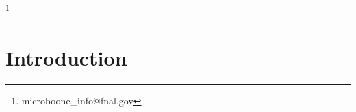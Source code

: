 \documentclass[amsmath,amssymb,aps,prd,showpacs,twocolumn,superscriptaddress,letterpaper,longbibliography, floatfix]{revtex4-2}
\begin{document}
\thanks{microboone\_info@fnal.gov}\noaffiliation


\begin{abstract}


We present a new measurement of the electron neutrino charged current cross section on argon without pions in the final state.  This measurement uses the full MicroBooNE Booster Neutrino Beam dataset of $1.3\times 10^{21}$ protons on target collected at Fermi National Accelerator Laboratory.  Events are considered both with and without protons above the kinetic energy visibility threshold.
Differential cross sections are extracted in proton and electron kinematics, including energy and angle relative to the neutrino beam direction. The relationship between the hadronic and leptonic systems is explored through the angle between the proton and electron directions.
The resulting cross sections are compared to a variety of available generator predictions using different models of neutrino interactions. We find good agreement with most models in lepton kinematics and some discrepancies in the hadronic system modeling, particularly in proton angle.
\end{abstract}

\maketitle

\section{Introduction}
\end{document}
